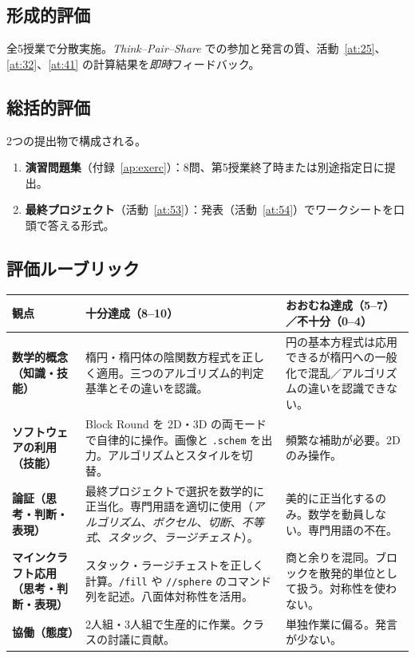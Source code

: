 \documentclass[12pt,a4paper]{scrartcl}
\newcommand{\cmd}[1]{\textcolor{earth}{\texttt{\small #1}}}
\begin{document}
\subsection{形成的評価}
全5授業で分散実施。\emph{Think--Pair--Share} での参加と発言の質、活動~\ref{at:25}、\ref{at:32}、\ref{at:41} の計算結果を\emph{即時}フィードバック。

\subsection{総括的評価}
2つの提出物で構成される。

\begin{enumerate}[leftmargin=1.5em,itemsep=0.2em,topsep=0.3em,nosep]
  \item \textbf{演習問題集}（付録~\ref{ap:exerc}）：8問、第5授業終了時または別途指定日に提出。
  \item \textbf{最終プロジェクト}（活動~\ref{at:53}）：発表（活動~\ref{at:54}）でワークシートを口頭で答える形式。
\end{enumerate}

\subsection{評価ルーブリック}

\begin{center}
\small
\begin{tabularx}{\textwidth}{@{}p{}XX@{}}
\toprule
\textbf{観点} & \textbf{十分達成（8--10）} & \textbf{おおむね達成（5--7）／不十分（0--4）} \\
\midrule
\textbf{数学的概念（知識・技能）} & 楕円・楕円体の陰関数方程式を正しく適用。三つのアルゴリズム的判定基準とその違いを認識。 & 円の基本方程式は応用できるが楕円への一般化で混乱／アルゴリズムの違いを認識できない。 \\
\addlinespace[3pt]
\textbf{ソフトウェアの利用（技能）} & Block Round を 2D・3D の両モードで自律的に操作。画像と \texttt{.schem} を出力。アルゴリズムとスタイルを切替。 & 頻繁な補助が必要。2D のみ操作。 \\
\addlinespace[3pt]
\textbf{論証（思考・判断・表現）} & 最終プロジェクトで選択を数学的に正当化。専門用語を適切に使用（\emph{アルゴリズム}、\emph{ボクセル}、\emph{切断}、\emph{不等式}、\emph{スタック}、\emph{ラージチェスト}）。 & 美的に正当化するのみ。数学を動員しない。専門用語の不在。 \\
\addlinespace[3pt]
\textbf{マインクラフト応用（思考・判断・表現）} & スタック・ラージチェストを正しく計算。\cmd{/fill} や \cmd{//sphere} のコマンド列を記述。八面体対称性を活用。 & 商と余りを混同。ブロックを散発的単位として扱う。対称性を使わない。 \\
\addlinespace[3pt]
\textbf{協働（態度）} & 2人組・3人組で生産的に作業。クラスの討議に貢献。 & 単独作業に偏る。発言が少ない。 \\
\bottomrule
\end{tabularx}
\end{center}
\end{document}

